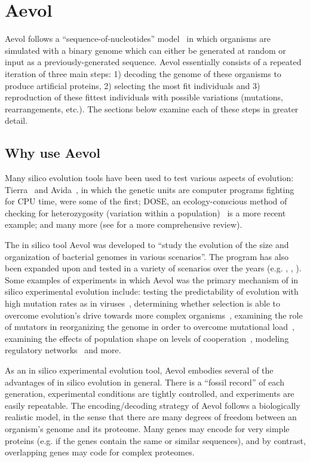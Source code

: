 \section{Aevol}
Aevol follows a ``sequence-of-nucleotides'' model~\cite{Batut.2013} in which organisms are simulated with a binary genome which can either be generated at random or input as a previously-generated sequence. Aevol essentially consists of a repeated iteration of three main steps: 1) decoding the genome of these organisms to produce artificial proteins, 2) selecting the most fit individuals and 3) reproduction of these fittest individuals with possible variations (mutations, rearrangements, etc.). The sections below examine each of these steps in greater detail.

\subsection{Why use Aevol}
Many silico evolution tools have been used to test various aspects of evolution: Tierra~\cite{Tierra-Ray} and Avida~\cite{Avida-Ofria}, in which the genetic units are computer programs fighting for CPU time, were some of the first; DOSE, an ecology-conscious method of checking for heterozygosity (variation within a population)~\cite{Castillo-DOSE} is a more recent example; and many more (see \cite{Mozhayskiy-In-Silico-Review} for a more comprehensive review). 

The in silico tool Aevol was developed to ``study the evolution of the size and organization of bacterial genomes in various scenarios''\cite{Batut.2013}. The program has also been expanded upon and tested in a variety of scenarios over the years (e.g. \cite{parsons2011selection}, \cite{misevic2012effects}, \cite{Miramontes.2016}). Some examples of experiments in which Aevol was the primary mechanism of in silico experimental evolution include: testing the predictability of evolution with high mutation rates as in viruses~\cite{beslon:hal-01577115}, determining whether selection is able to overcome evolution's drive towards more complex organisms~\cite{Liard.2018}, examining the role of mutators in reorganizing the genome in order to overcome mutational load~\cite{doi:10.1186/s12862-019-1507-z}, examining the effects of population shape on levels of cooperation~\cite{Miramontes.2016}, modeling regulatory networks~\cite{sanchezdehesa:hal-01502737} and more. 

As an in silico experimental evolution tool, Aevol embodies several of the advantages of in silico evolution in general. There is a ``fossil record'' of each generation, experimental conditions are tightly controlled, and experiments are easily repeatable. The encoding/decoding strategy of Aevol follows a biologically realistic model, in the sense that there are many degrees of freedom between an organism's genome and its proteome. Many genes may encode for very simple proteins (e.g. if the genes contain the same or similar sequences), and by contrast, overlapping genes may code for complex proteomes.

